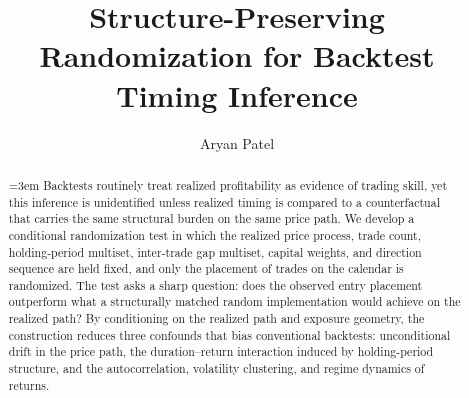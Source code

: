 \documentclass[preprint,12pt]{elsarticle}
\theoremstyle{definition}
\begin{document}
\begin{frontmatter}

\title{Structure-Preserving Randomization for Backtest Timing Inference}

\author{Aryan Patel}

\begin{abstract}
\begingroup
\parindent=0pt
\emergencystretch=3em
Backtests routinely treat realized profitability as evidence of trading skill, yet this inference is unidentified unless realized timing is compared to a counterfactual that carries the same structural burden on the same price path. We develop a conditional randomization test in which the realized price process, trade count, holding-period multiset, inter-trade gap multiset, capital weights, and direction sequence are held fixed, and only the placement of trades on the calendar is randomized. The test asks a sharp question: does the observed entry placement outperform what a structurally matched random implementation would achieve on the realized path? By conditioning on the realized path and exposure geometry, the construction reduces three confounds that bias conventional backtests: unconditional drift in the price path, the duration--return interaction induced by holding-period structure, and the autocorrelation, volatility clustering, and regime dynamics of returns.


\end{abstract}
\end{frontmatter}
\end{document}
